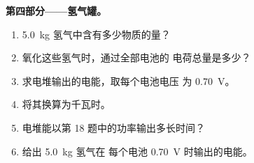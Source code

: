 \begin{problem}
\medskip
\noindent\textbf{第四部分——氢气罐。}
\begin{enumerate}[resume]
  \item \qty{5.0}{kg} 氢气中含有多少物质的量？
  \item 氧化这些氢气时，通过全部电池的
        电荷总量是多少？
  \item 求电堆输出的电能，取每个电池电压
        为 \qty{0.70}{V}。
  \item 将其换算为千瓦时。
  \item 电堆能以第 18 题中的功率输出多长时间？
  \item 给出 \qty{5.0}{kg} 氢气在
        每个电池 \qty{0.70}{V} 时输出的电能。
\end{enumerate}
\end{problem}
